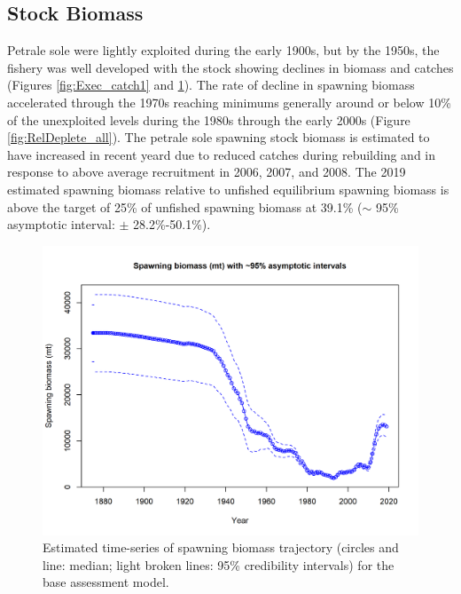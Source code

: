 \documentclass[12pt,]{article}
\begin{document}
\subsection*{Stock Biomass}\label{stock-biomass}

Petrale sole were lightly exploited during the early 1900s, but by the
1950s, the fishery was well developed with the stock showing declines in
biomass and catches (Figures \ref{fig:Exec_catch1} and
\ref{fig:Spawnbio_all}). The rate of decline in spawning biomass
accelerated through the 1970s reaching minimums generally around or
below 10\% of the unexploited levels during the 1980s through the early
2000s (Figure \ref{fig:RelDeplete_all}). The petrale sole spawning stock
biomass is estimated to have increased in recent yeard due to reduced
catches during rebuilding and in response to above average recruitment
in 2006, 2007, and 2008. The 2019 estimated spawning biomass relative to
unfished equilibrium spawning biomass is above the target of 25\% of
unfished spawning biomass at 39.1\% (\(\sim\) 95\% asymptotic interval:
\(\pm\) 28.2\%-50.1\%).

\begin{figure}
\centering
\includegraphics{r4ss/plots_mod1/ts7_Spawning_biomass_(mt)_with_95_asymptotic_intervals_intervals.png}
\caption{Estimated time-series of spawning biomass trajectory (circles
and line: median; light broken lines: 95\% credibility intervals) for
the base assessment model. \label{fig:Spawnbio_all}}
\end{figure}
\end{document}
